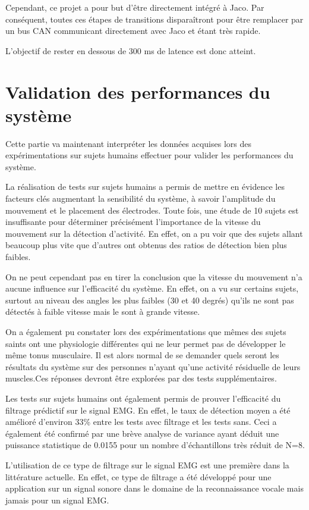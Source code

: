 \documentclass[letterpaper, twoside, 12pt, memoire, creativecommons, hyperref]{thETS}
\begin{document}
Cependant, ce projet a pour but d'être directement intégré à Jaco. Par conséquent, toutes ces étapes de transitions disparaîtront pour être remplacer par un bus CAN communicant directement avec Jaco et étant très rapide. 

L'objectif de rester en dessous de 300 ms de latence est donc atteint.

\section{Validation des performances du système}

Cette partie va maintenant interpréter les données acquises lors des expérimentations sur sujets humains effectuer pour valider les performances du système. 

La réalisation de tests sur sujets humains a permis de mettre en évidence les facteurs clés augmentant la sensibilité du système, à savoir l'amplitude du mouvement et le placement des électrodes. Toute fois, une étude de 10 sujets est insuffisante pour déterminer précisément l'importance de la vitesse du mouvement sur la détection d'activité. En effet, on a pu voir que des sujets allant beaucoup plus vite que d'autres ont obtenus des ratios de détection bien plus faibles.

On ne peut cependant pas en tirer la conclusion que la vitesse du mouvement n'a aucune influence sur l'efficacité du système. En effet, on a vu sur certains sujets, surtout au niveau des angles les plus faibles (30 et 40 degrés) qu'ils ne sont pas détectés à faible vitesse mais le sont à grande vitesse.

On a également pu constater lors des expérimentations que mêmes des sujets saints ont une physiologie différentes qui ne leur permet pas de développer le même tonus musculaire. Il est alors normal de se demander quels seront les résultats du système sur des personnes n'ayant qu'une activité résiduelle de leurs muscles.Ces réponses devront être explorées par des tests supplémentaires.

Les tests sur sujets humains ont également permis de prouver l'efficacité du filtrage prédictif sur le signal EMG. En effet, le taux de détection moyen a été amélioré d'environ 33\% entre les tests avec filtrage et les tests sans. Ceci a également été confirmé par une brève analyse de variance ayant déduit une puissance statistique de 0.0155 pour un nombre d'échantillons très réduit de N=8.

L'utilisation de ce type de filtrage sur le signal EMG est une première dans la littérature actuelle. En effet, ce type de filtrage a été développé pour une application sur un signal sonore dans le domaine de la reconnaissance vocale mais jamais pour un signal EMG.
\end{document}
